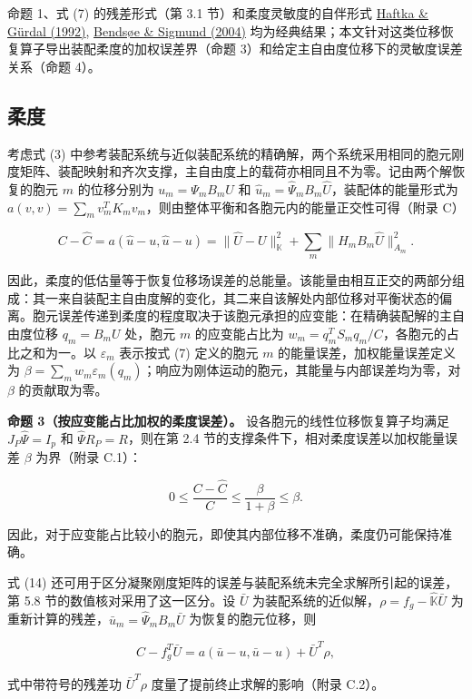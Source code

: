 \documentclass[preprint,12pt,authoryear]{elsarticle}
\begin{document}
命题 1、式 (7) 的残差形式（第 3.1 节）和柔度灵敏度的自伴形式 \href{https://doi.org/10.1007/978-94-011-2550-5}{Haftka \& Gürdal (1992)}, \href{https://doi.org/10.1007/978-3-662-05086-6}{Bendsøe \& Sigmund (2004)} 均为经典结果；本文针对这类位移恢复算子导出装配柔度的加权误差界（命题 3）和给定主自由度位移下的灵敏度误差关系（命题 4）。

\subsection{柔度}

考虑式 (3) 中参考装配系统与近似装配系统的精确解，两个系统采用相同的胞元刚度矩阵、装配映射和齐次支撑，主自由度上的载荷亦相同且不为零。记由两个解恢复的胞元 \(m\) 的位移分别为 \(u_m=\Psi_mB_mU\) 和 \(\widehat u_m=\widehat\Psi_mB_m\widehat U\)，装配体的能量形式为 \(a(v,v)=\sum_m v_m^TK_mv_m\)，则由整体平衡和各胞元内的能量正交性可得（附录 C）

\[
C-\widehat C
=a(\widehat u-u,\widehat u-u)
=\|\widehat U-U\|_{\mathbb K}^{2}
+\sum_m\|H_mB_m\widehat U\|_{A_m}^{2}.
\tag{14}
\]

因此，柔度的低估量等于恢复位移场误差的总能量。该能量由相互正交的两部分组成：其一来自装配主自由度解的变化，其二来自该解处内部位移对平衡状态的偏离。胞元误差传递到柔度的程度取决于该胞元承担的应变能：在精确装配解的主自由度位移 \(q_m=B_mU\) 处，胞元 \(m\) 的应变能占比为 \(w_m=q_m^TS_mq_m/C\)，各胞元的占比之和为一。以 \(\varepsilon_m\) 表示按式 (7) 定义的胞元 \(m\) 的能量误差，加权能量误差定义为 \(\beta=\sum_mw_m\varepsilon_m(q_m)\)；响应为刚体运动的胞元，其能量与内部误差均为零，对 \(\beta\) 的贡献取为零。

\textbf{命题 3（按应变能占比加权的柔度误差）。} 设各胞元的线性位移恢复算子均满足 \(J_P\widehat\Psi=I_p\) 和 \(\widehat\Psi R_P=R\)，则在第 2.4 节的支撑条件下，相对柔度误差以加权能量误差 \(\beta\) 为界（附录 C.1）：

\[
\boxed{0\le\frac{C-\widehat C}{C}\le\frac{\beta}{1+\beta}\le\beta.}
\tag{15}
\]

因此，对于应变能占比较小的胞元，即使其内部位移不准确，柔度仍可能保持准确。

式 (14) 还可用于区分凝聚刚度矩阵的误差与装配系统未完全求解所引起的误差，第 5.8 节的数值核对采用了这一区分。设 \(\bar U\) 为装配系统的近似解，\(\rho=f_g-\widehat{\mathbb K}\bar U\) 为重新计算的残差，\(\bar u_m=\widehat\Psi_mB_m\bar U\) 为恢复的胞元位移，则

\[
C-f_g^T\bar U=a(\bar u-u,\bar u-u)+\bar U^T\rho,
\tag{16}
\]

式中带符号的残差功 \(\bar U^T\rho\) 度量了提前终止求解的影响（附录 C.2）。
\end{document}
